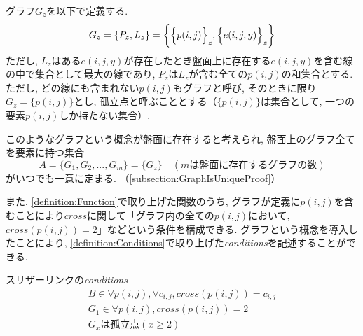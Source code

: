 \begin{definition}[グラフ]\label{definition:GraphDefinition}
  グラフ$G_z$を以下で定義する.
  \begin{equation*}
    G_z=\{P_z,L_z\}=\biggl\{  \Bigl\{p(i,j)\Bigr\}_z,\Bigl\{e(i,j,y)\Bigr\}_z\biggr\}
  \end{equation*}
  ただし, $L_z$はある$e(i,j,y)$が存在したとき盤面上に存在する$e(i,j,y)$を含む線の中で集合として最大の線であり,  $P_z$は$L_z$が含む全ての$p(i,j)$の和集合とする. ただし, どの線にも含まれない$p(i,j)$もグラフと呼び, そのときに限り$G_z=\{p(i,j)\}$とし,   孤立点と呼ぶこととする（$\{p(i,j)\}$は集合として, 一つの要素$p(i,j)$しか持たない集合）.
\end{definition}

このようなグラフという概念が盤面に存在すると考えられ, 盤面上のグラフ全てを要素に持つ集合
\begin{equation*}
  A=\{G_1,G_2,...,G_m\}=\{G_z\}\quad (mは盤面に存在するグラフの数)
\end{equation*}
がいつでも一意に定まる. （\cref{subsection:GraphIsUniqueProof}）

また, \cref{definition:Function}で取り上げた関数のうち, グラフが定義に$p(i,j)$を含むことにより$\textit{cross}$に関して「グラフ内の全ての$p(i,j)$において, $\textit{cross}(p(i,j))=2$」などという条件を構成できる. グラフという概念を導入したことにより, \cref{definition:Conditions}で取り上げた\textit{conditions}を記述することができる.
\begin{example}\textup{スリザーリンクの\textit{conditions}}\label{example:SlitherLinkConditions}
  \begin{gather*}
    B\in \forall p(i,j)   ,  \forall c_{i,j} , \textit{cross}(p(i,j))=c_{i,j} \\
    G_1\in \forall p(i,j)            , \textit{cross}(p(i,j))=2       \\
    G_xは孤立点(x\geq 2)
  \end{gather*}
\end{example}
